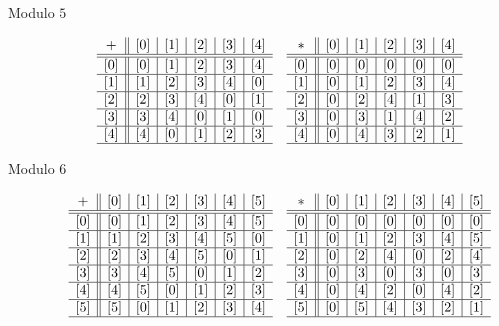 \documentclass[letterpaper, 11 pt]{ximera}
\begin{document}
\begin{br}
\begin{description}
 \item[Modulo $5$] 
 \begin{align*}
& \begin{array}{c||c|c|c|c|c}
 + & [0] & [1] & [2] & [3] & [4]\\ \hline\hline
 [0] & [0] & [1] & [2] & [3] & [4]\\ \hline
 [1] & [1] & [2] & [3] & [4] & [0] \\ \hline
 [2] & [2] & [3] & [4] & [0] & [1]\\ \hline
 [3] & [3] & [4] & [0] & [1] & [0]\\ \hline
 [4] & [4] & [0] & [1] & [2] & [3]\\ \hline
\end{array}
& \begin{array}{c||c|c|c|c|c}
 \ast & [0] & [1] & [2] & [3] & [4]\\ \hline\hline
 [0] & [0] & [0] & [0] & [0] & [0]\\ \hline
 [1] & [0] & [1] & [2] & [3] & [4]\\ \hline
 [2] & [0] & [2] & [4] & [1] & [3]\\ \hline
 [3] & [0] & [3] & [1] & [4] & [2]\\ \hline
 [4] & [0] & [4] & [3] & [2] & [1]\\ \hline
\end{array}
\end{align*}

 \item[Modulo $6$] 
 \begin{align*}
& \begin{array}{c||c|c|c|c|c|c}
 + & [0] & [1] & [2] & [3] & [4] & [5]\\ \hline\hline
 [0] & [0] & [1] & [2] & [3] & [4] & [5]\\ \hline
 [1] & [1] & [2] & [3] & [4] & [5] & [0] \\ \hline
 [2] & [2] & [3] & [4] & [5] & [0] & [1]\\ \hline
 [3] & [3] & [4] & [5] & [0] & [1] & [2]\\ \hline
 [4] & [4] & [5] & [0] & [1] & [2] & [3]\\ \hline
 [5] & [5] & [0] & [1] & [2] & [3] & [4]\\ \hline
\end{array}
& \begin{array}{c||c|c|c|c|c|c}
 \ast & [0] & [1] & [2] & [3] & [4] & [5]\\ \hline\hline
 [0] & [0] & [0] & [0] & [0] & [0] & [0]\\ \hline
 [1] & [0] & [1] & [2] & [3] & [4] & [5]\\ \hline
 [2] & [0] & [2] & [4] & [0] & [2] & [4]\\ \hline
 [3] & [0] & [3] & [0] & [3] & [0] & [3]\\ \hline
 [4] & [0] & [4] & [2] & [0] & [4] & [2]\\ \hline
 [5] & [0] & [5] & [4] & [3] & [2] & [1]\\ \hline
\end{array}
\end{align*}


\end{description}
\end{br}
\end{document}
